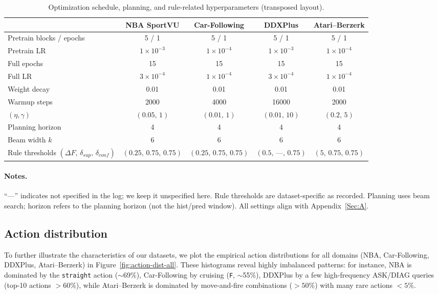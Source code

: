 \documentclass{article} %
\begin{document}
\begin{table}[t]
\centering
\small
\setlength{\tabcolsep}{6pt}
\renewcommand{\arraystretch}{1.12}
\caption{Optimization schedule, planning, and rule-related hyperparameters (transposed layout).}
\label{tab:exp-params-optim-T}
\begin{tabular}{lcccc}
\toprule
 & \textbf{NBA SportVU} & \textbf{Car-Following} & \textbf{DDXPlus} & \textbf{Atari–Berzerk} \\
\midrule
Pretrain blocks / epochs
 & 5 / 1 & 5 / 1 & 5 / 1 & 5 / 1 \\
Pretrain LR
 & $1{\times}10^{-3}$ & $1{\times}10^{-4}$ & $1{\times}10^{-3}$ & $1{\times}10^{-4}$ \\
Full epochs
 & 15 & 15 & 15 & 15 \\
Full LR
 & $3{\times}10^{-4}$ & $1{\times}10^{-4}$ & $3{\times}10^{-4}$ & $1{\times}10^{-4}$ \\
Weight decay
 & 0.01 & 0.01 & 0.01 & 0.01 \\
Warmup steps
 & 2000 & 4000 & 16000 & 2000 \\
$(\eta,\gamma)$
 & $(0.05,\,1)$ & $(0.01,\,1)$ & $(0.01,\,10)$ & $(0.2,\,5)$ \\
Planning horizon
 & 4 & 4 & 4 & 4 \\
Beam width $k$
 & 6 & 6 & 6 & 6 \\
\makecell[l]{Rule thresholds \\ $(\Delta F,\,\delta_{sup},\,\delta_{conf})$}
 & $(0.25,\,0.75,\,0.75)$
 & $(0.25,\,0.75,\,0.75)$
 & $(0.5,\,\text{—},\,0.75)$
 & $(5,\,0.75,\,0.75)$ \\
\bottomrule
\end{tabular}
\end{table}


\paragraph{Notes.}
“—” indicates not specified in the log; we keep it unspecified here. Rule thresholds are dataset-specific as recorded. Planning uses beam search; horizon refers to the planning horizon (not the hist/pred window). All settings align with Appendix~\ref{Sec:A}.


\subsection{Action distribution}
\label{Sec:B8}

To further illustrate the characteristics of our datasets, we plot the empirical
action distributions for all domains (NBA, Car-Following, DDXPlus, Atari–Berzerk)
in Figure~\ref{fig:action-dist-all}. These histograms reveal highly imbalanced
patterns: for instance, NBA is dominated by the \texttt{straight} action
($\sim$69\%), Car-Following by cruising (\texttt{F}, $\sim$55\%), DDXPlus by a few
high-frequency ASK/DIAG queries (top-10 actions $>60\%$), while Atari–Berzerk is
dominated by move-and-fire combinations ($>50\%$) with many rare actions
$<5\%$.
\end{document}
